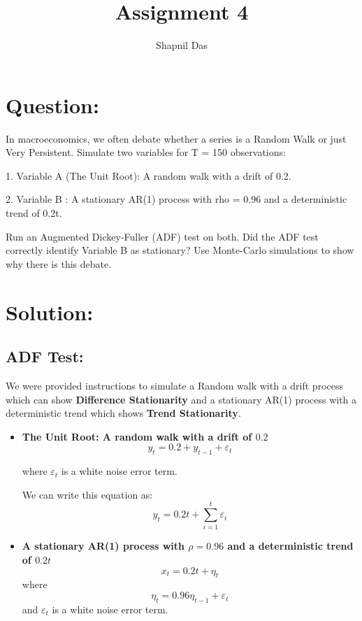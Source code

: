 \documentclass[12pt]{article}
\title{Assignment 4}
\author{Shapnil Das}
\begin{document}
\maketitle

\section{Question:}
In macroeconomics, we often debate whether a series is a Random Walk or just Very Persistent.
Simulate two variables for T = 150 observations:

1. Variable A (The Unit Root): A random walk with a drift of 0.2.

2. Variable B : A stationary AR(1) process with rho = 0.96 and a deterministic trend of 0.2t.

Run an Augmented Dickey-Fuller (ADF) test on both.
Did the ADF test correctly identify Variable B as stationary?
Use Monte-Carlo simulations to show why there is this debate.

\section{Solution:}
\subsection{ADF Test:}

We were provided instructions to simulate a Random walk with a drift process which can show
\textbf{Difference Stationarity} and a stationary AR(1) process with a deterministic trend which shows \textbf{Trend Stationarity}.

\begin{itemize}
    \item \textbf{The Unit Root: A random walk with a drift of $0.2$}
          \begin{equation}
              y_t = 0.2 + y_{t-1} + \varepsilon_t
          \end{equation}

          where $\varepsilon_t$ is a white noise error term.

          We can write this equation as:
          \begin{equation}
              y_t = 0.2t + \sum_{i=1}^{t} \varepsilon_i
          \end{equation}

    \item \textbf{ A stationary AR(1) process with $\rho = 0.96$ and a deterministic trend of $0.2t$}
          \[ x_t = 0.2t + \eta_t \]
          where \[\eta_t = 0.96\eta_{t-1} + \varepsilon_t \]
          and $\varepsilon_t$ is a white noise error term.
\end{itemize}
\end{document}
